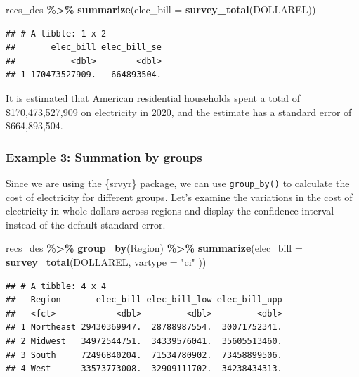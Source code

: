 \documentclass[
]{krantz}
\makeatletter
\newenvironment{Shaded}{\begin{snugshade}}{\end{snugshade}}
\newcommand{\AttributeTok}[1]{\textcolor[rgb]{0.27,0.27,0.27}{#1}}
\newcommand{\FunctionTok}[1]{\textcolor[rgb]{0.27,0.27,0.27}{\textbf{#1}}}
\newcommand{\NormalTok}[1]{#1}
\newcommand{\SpecialCharTok}[1]{\textcolor[rgb]{0.43,0.43,0.43}{\textbf{#1}}}
\newcommand{\StringTok}[1]{\textcolor[rgb]{0.5,0.5,0.5}{#1}}
\newenvironment{kframe}{%
\medskip{}
\setlength{\fboxsep}{.8em}
 \def\at@end@of@kframe{}%
 \ifinner\ifhmode%
  \def\at@end@of@kframe{\end{minipage}}%
  \begin{minipage}{\columnwidth}%
 \fi\fi%
 \def\FrameCommand##1{\hskip\@totalleftmargin \hskip-\fboxsep
 \colorbox{shadecolor}{##1}\hskip-\fboxsep
     \hskip-\linewidth \hskip-\@totalleftmargin \hskip\columnwidth}%
 \MakeFramed {\advance\hsize-\width
   \@totalleftmargin\z@ \linewidth\hsize
   \@setminipage}}%
 {\par\unskip\endMakeFramed%
 \at@end@of@kframe}
\renewenvironment{Shaded}{\begin{kframe}}{\end{kframe}}
\makeatother
\begin{document}
\begin{Shaded}
\begin{Highlighting}[]
\NormalTok{recs\_des }\SpecialCharTok{\%\textgreater{}\%}
  \FunctionTok{summarize}\NormalTok{(}\AttributeTok{elec\_bill =} \FunctionTok{survey\_total}\NormalTok{(DOLLAREL))}
\end{Highlighting}
\end{Shaded}

\begin{verbatim}
## # A tibble: 1 x 2
##       elec_bill elec_bill_se
##           <dbl>        <dbl>
## 1 170473527909.   664893504.
\end{verbatim}

It is estimated that American residential households spent a total of \$170,473,527,909 on electricity in 2020, and the estimate has a standard error of \$664,893,504.

\hypertarget{example-3-summation-by-groups}{%
\subsubsection*{Example 3: Summation by groups}\label{example-3-summation-by-groups}}


Since we are using the \{srvyr\} package, we can use \texttt{group\_by()} to calculate the cost of electricity for different groups. Let's examine the variations in the cost of electricity in whole dollars across regions and display the confidence interval instead of the default standard error.

\begin{Shaded}
\begin{Highlighting}[]
\NormalTok{recs\_des }\SpecialCharTok{\%\textgreater{}\%}
  \FunctionTok{group\_by}\NormalTok{(Region) }\SpecialCharTok{\%\textgreater{}\%}
  \FunctionTok{summarize}\NormalTok{(}\AttributeTok{elec\_bill =} \FunctionTok{survey\_total}\NormalTok{(DOLLAREL,}
    \AttributeTok{vartype =} \StringTok{"ci"}
\NormalTok{  ))}
\end{Highlighting}
\end{Shaded}

\begin{verbatim}
## # A tibble: 4 x 4
##   Region       elec_bill elec_bill_low elec_bill_upp
##   <fct>            <dbl>         <dbl>         <dbl>
## 1 Northeast 29430369947.  28788987554.  30071752341.
## 2 Midwest   34972544751.  34339576041.  35605513460.
## 3 South     72496840204.  71534780902.  73458899506.
## 4 West      33573773008.  32909111702.  34238434313.
\end{verbatim}
\end{document}
